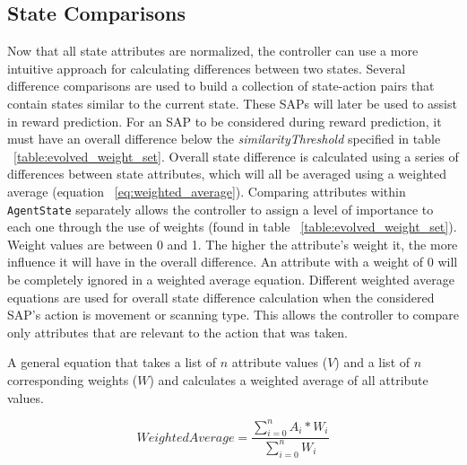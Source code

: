 \subsection{State Comparisons}
Now that all state attributes are normalized, the controller can use a more intuitive approach for calculating differences between two states.
Several difference comparisons are used to build a collection of state-action pairs that contain states similar to the current state.
These SAPs will later be used to assist in reward prediction.
For an SAP to be considered during reward prediction, it must have an overall difference below the \textit{similarityThreshold} specified in table ~\ref{table:evolved_weight_set}.
Overall state difference is calculated using a series of differences between state attributes, which will all be averaged using a weighted average (equation ~\ref{eq:weighted_average}).
Comparing attributes within \texttt{AgentState} separately allows the controller to assign a level of importance to each one through the use of weights (found in table ~\ref{table:evolved_weight_set}).
Weight values are between 0 and 1.
The higher the attribute's weight it, the more influence it will have in the overall difference.
An attribute with a weight of 0 will be completely ignored in a weighted average equation.
Different weighted average equations are used for overall state difference calculation when the considered SAP's action is movement or scanning type.
This allows the controller to compare only attributes that are relevant to the action that was taken.

\caption{A general equation that takes a list of $n$ attribute values ($V$) and a list of $n$ corresponding weights ($W$) and calculates a weighted average of all attribute values.}
\begin{equation} \label{eq:weighted_average}
  WeightedAverage = \frac{\sum_{i=0}^{n} A_{i} * W_{i}}{\sum_{i=0}^{n} W_{i}}
\end{equation}

